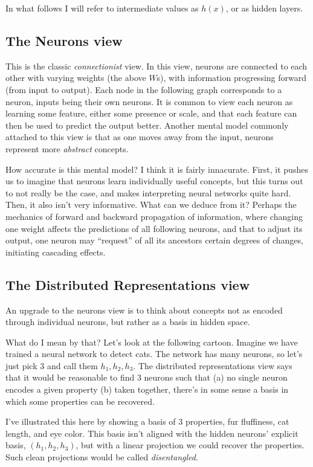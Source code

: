 In what follows I will refer to intermediate values as $h(x)$, or as hidden layers.

\subsection{The Neurons view}

This is the classic \emph{connectionist} view. In this view, neurons are connected to each other with varying weights (the above $W$s), with information progressing forward (from input to output). Each node in the following graph corresponds to a neuron, inputs being their own neurons.
It is common to view each neuron as learning some feature, either some presence or scale, and that each feature can then be used to predict the output better. Another mental model commonly attached to this view is that as one moves away from the input, neurons represent more \emph{abstract} concepts.

How accurate is this mental model? I think it is fairly innacurate. First, it pushes us to imagine that neurons learn individually useful concepts, but this turns out to not really be the case, and makes interpreting neural networks quite hard. Then, it also isn't very informative. What can we deduce from it? Perhaps the mechanics of forward and backward propagation of information, where changing one weight affects the predictions of all following neurons, and that to adjust its output, one neuron may ``request'' of all its ancestors certain degrees of changes, initiating cascading effects.

\subsection{The Distributed Representations view}

An upgrade to the neurons view is to think about concepts not as encoded through individual neurons, but rather as a basis in hidden space.

What do I mean by that? Let's look at the following cartoon. Imagine we have trained a neural network to detect cats. The network has many neurons, so let's just pick 3 and call them $h_1,h_2,h_3$. The distributed representations view says that it would be reasonable to find 3 neurons such that (a) no single neuron encodes a given property (b) taken together, there's in some sense a basis in which some properties can be recovered.

I've illustrated this here by showing a basis of 3 properties, fur fluffiness, cat length, and eye color. This basis isn't aligned with the hidden neurons' explicit basis, $(h_1,h_2,h_3)$, but with a linear projection we could recover the properties. Such clean projections would be called \emph{disentangled}.

